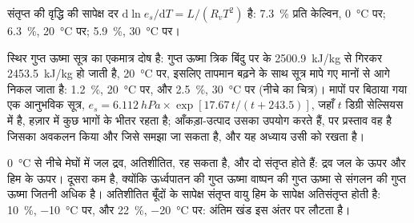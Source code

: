 \begin{corollary}[प्रति केल्विन सात प्रतिशत]\label{cor:b2:atmospheric-thermodynamics:seven}
संतृप्त  की वृद्धि की सापेक्ष दर
$\mathrm{d}\ln e_s/\mathrm{d}T = L/(R_v T^2)$ है:
\qty{7.3}{\percent} प्रति केल्विन, \qty{0}{\celsius} पर;
\qty{6.3}{\percent}, \qty{20}{\celsius} पर; \qty{5.9}{\percent}, \qty{30}{\celsius} पर।
\end{corollary}

स्थिर गुप्त ऊष्मा सूत्र का एकमात्र दोष है: गुप्त ऊष्मा त्रिक बिंदु पर के
\qty{2500.9}{kJ/kg} से गिरकर \qty{2453.5}{kJ/kg} हो जाती है, \qty{20}{\celsius} पर, इसलिए तापमान बढ़ने के साथ
सूत्र मापे गए मानों से आगे निकल जाता है: \qty{1.2}{\percent}, \qty{20}{\celsius} पर, और
\qty{2.5}{\percent}, \qty{30}{\celsius} पर (नीचे का चित्र)। मापों पर बिठाया गया एक आनुभविक
सूत्र, $e_s = \qty{6.112}{hPa} \times \exp[17.67\,t/(t + 243.5)]$, जहाँ
$t$ डिग्री सेल्सियस में है, हज़ार में कुछ भागों के भीतर रहता है; आँकड़ा-उत्पाद उसका उपयोग करते हैं, पर
प्रस्ताव वह है जिसका अवकलन किया और जिसे समझा जा सकता है, और यह अध्याय उसी को रखता है।

\qty{0}{\celsius} से नीचे मेघों में जल द्रव, अतिशीतित, रह सकता है, और दो संतृप्त
 होते हैं: द्रव जल के ऊपर और हिम के ऊपर। दूसरा कम है, क्योंकि ऊर्ध्वपातन की गुप्त
ऊष्मा वाष्पन की गुप्त ऊष्मा से संगलन की गुप्त ऊष्मा जितनी अधिक है। अतिशीतित बूँदों के सापेक्ष संतृप्त वायु
हिम के सापेक्ष अतिसंतृप्त होती है: \qty{10}{\percent}, \qty{-10}{\celsius} पर, और
\qty{22}{\percent}, \qty{-20}{\celsius} पर: अंतिम खंड इस अंतर पर
लौटता है।

